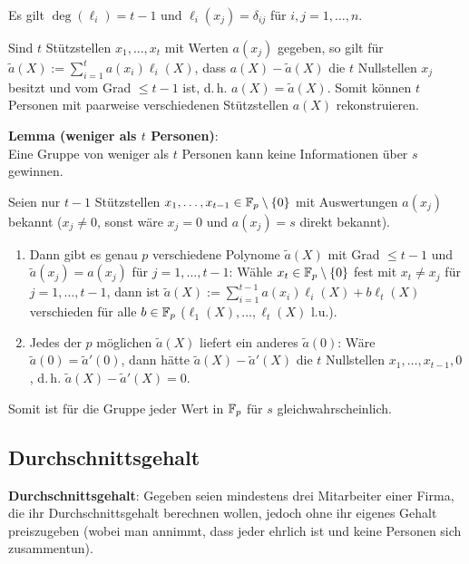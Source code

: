 Es gilt $\deg(\ell_i) = t - 1$ und $\ell_i(x_j) = \delta_{ij}$ für $i, j = 1, \dotsc, n$.

Sind $t$ Stützstellen $x_1, \dotsc, x_t$ mit Werten $a(x_j)$ gegeben, so gilt
für $\widetilde{a}(X) := \sum_{i=1}^t a(x_i) \ell_i(X)$,
dass $a(X) - \widetilde{a}(X)$ die $t$ Nullstellen $x_j$ besitzt und
vom Grad $\le t - 1$ ist, d.\,h. $a(X) = \widetilde{a}(X)$.
Somit können $t$ Personen mit paarweise verschiedenen Stützstellen $a(X)$ rekonstruieren.

\textbf{Lemma (weniger als $t$ Personen)}:\\
Eine Gruppe von weniger als $t$ Personen kann keine Informationen über $s$ gewinnen.

\begin{Beweis}
    Seien nur $t - 1$ Stützstellen $x_1, \dotsc, x_{t-1} \in \mathbb{F}_p \setminus \{0\}$
    mit Auswertungen $a(x_j)$ bekannt
    ($x_j \not= 0$, sonst wäre $x_j = 0$ und $a(x_j) = s$ direkt bekannt).
    \begin{enumerate}
        \item
        Dann gibt es genau $p$ verschiedene Polynome $\widetilde{a}(X)$ mit Grad $\le t - 1$ und
        $\widetilde{a}(x_j) = a(x_j)$ für $j = 1, \dotsc, t - 1$:
        Wähle $x_t \in \mathbb{F}_p \setminus \{0\}$ fest mit $x_t \not= x_j$ für $j = 1, \dotsc, t-1$,
        dann ist $\widetilde{a}(X) := \sum_{i=1}^{t-1} a(x_i) \ell_i(X) + b\ell_t(X)$
        verschieden für alle $b \in \mathbb{F}_p$
        ($\ell_1(X), \dotsc, \ell_t(X)$ l.u.).

        \item
        Jedes der $p$ möglichen $\widetilde{a}(X)$ liefert ein anderes $\widetilde{a}(0)$:
        Wäre $\widetilde{a}(0) = \widetilde{a}'(0)$, dann hätte
        $\widetilde{a}(X) - \widetilde{a}'(X)$
        die $t$ Nullstellen $x_1, \dotsc, x_{t-1}, 0$, d.\,h.
        $\widetilde{a}(X) - \widetilde{a}'(X) = 0$.
    \end{enumerate}
    Somit ist für die Gruppe jeder Wert in $\mathbb{F}_p$ für $s$ gleichwahrscheinlich.
\end{Beweis}

\pagebreak

\subsection{%
    Durchschnittsgehalt%
}

\textbf{Durchschnittsgehalt}:
Gegeben seien mindestens drei Mitarbeiter einer Firma, die ihr Durchschnittsgehalt berechnen
wollen, jedoch ohne ihr eigenes Gehalt preiszugeben
(wobei man annimmt, dass jeder ehrlich ist und keine Personen sich zusammentun).

